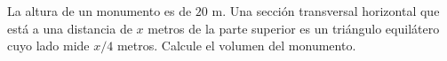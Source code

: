 \item La altura de un monumento es de $20 \text{ m}$. Una sección transversal horizontal que está a una distancia de $x$ metros de la parte superior es un triángulo equilátero cuyo lado mide $x/4$ metros. Calcule el volumen del monumento.
